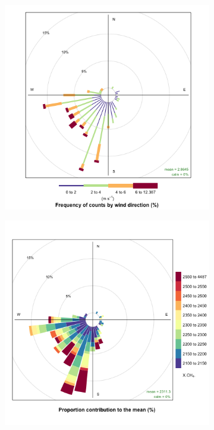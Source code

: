 \begin{figure}
\centering
\begin{subfigure}{.5\textwidth}
  \centering
  \includegraphics[width=1\linewidth]{figures/Appendix/Windrose/WindRose_Peaks_medium_peaks.png}
  \caption{}
  \label{WindrosePeaks}
\end{subfigure}%
\begin{subfigure}{.5\textwidth}
  \centering
  \includegraphics[width=1\linewidth]{figures/Appendix/Windrose/PollutionRose_Peaks_medium_peaks.png}

\end{subfigure}
\end{figure}

